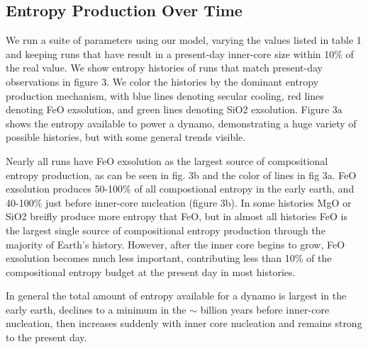 \documentclass[]{article}
\begin{document}
	\subsection{Entropy Production Over Time}\label{entropy-production-over-time}
	We run a suite of parameters using our model, varying the values listed in table 1 and keeping runs that have result in a present-day inner-core size within
	10\% of the real value. We show entropy histories of runs that match present-day observations in figure 3. We color the histories by the dominant entropy production mechanism, with blue lines denoting secular cooling, red lines denoting FeO exsolution, and green lines denoting SiO2 exsolution. Figure 3a shows the entropy available to power a dynamo, demonstrating a huge variety of possible histories, but with some general trends visible. 
	
	Nearly all runs have FeO exsolution as the largest source of compositional entropy production, as can be seen in fig. 3b and the color of lines in fig 3a. 
	FeO exsolution produces 50-100\% of all compostional entropy in the early earth, and 40-100\% just before inner-core nucleation (figure 3b). In some histories MgO or SiO2 breifly produce more entropy that FeO, but in almost all histories FeO is the largest single source of compositional entropy production through the majority of Earth's history. However, after the inner core begins to grow, FeO
	exsolution becomes much less important, contributing less than 10\% of
	the compositional entropy budget at the present day in most histories.
	
	In general the total amount of entropy available for a dynamo is largest in the early earth, declines to a minimum in the $\sim$  billion years before inner-core nucleation, then increases suddenly with inner core nucleation and remains strong to the present day. 
	
\end{document}
